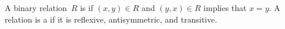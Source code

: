 \documentclass{ibl}  %
\begin{document}
\begin{problem}
\end{problem}

\begin{df}
A binary relation~$R$ is  if
$(x,y)\in R$ and $(y,x)\in R$ implies that $x=y$.
A relation is a  if it is 
reflexive, antisymmetric, and transitive.  
\end{df}
\end{document}

